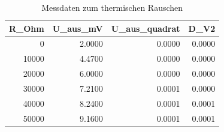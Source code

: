 \begin{table}
\caption{Messdaten zum thermischen Rauschen}
\label{tab:rauschen}
\begin{tabular}{rrrr}
\toprule
R_Ohm & U_aus_mV & U_aus_quadrat & D_V2 \\
\midrule
0 & 2.0000 & 0.0000 & 0.0000 \\
10000 & 4.4700 & 0.0000 & 0.0000 \\
20000 & 6.0000 & 0.0000 & 0.0000 \\
30000 & 7.2100 & 0.0001 & 0.0000 \\
40000 & 8.2400 & 0.0001 & 0.0001 \\
50000 & 9.1600 & 0.0001 & 0.0001 \\
\bottomrule
\end{tabular}
\end{table}
